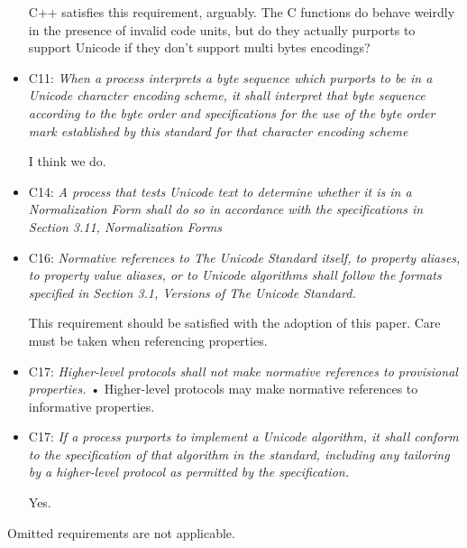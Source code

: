 \documentclass{wg21}
\begin{document}
\begin{itemize}
    C++ satisfies this requirement, arguably. The C functions do behave weirdly in the presence of invalid code units, but do they actually purports to support Unicode if they don't support multi bytes encodings?

    \item C11: \emph{When a process interprets a byte sequence which purports to be in a Unicode character
        encoding scheme, it shall interpret that byte sequence according to the byte order and
        specifications for the use of the byte order mark established by this standard for that
        character encoding scheme}

    I think we do.

    \item C14: \emph{A process that tests Unicode text to determine whether it is in a Normalization Form
        shall do so in accordance with the specifications in Section 3.11, Normalization Forms}


    \item C16: \emph{Normative references to The Unicode Standard itself, to property aliases, to property
        value aliases, or to Unicode algorithms shall follow the formats specified in Section 3.1,
        Versions of The Unicode Standard.}

    This requirement should be satisfied with the adoption of this paper.
    Care must be taken when referencing properties.

    \item C17: \emph{Higher-level protocols shall not make normative references to provisional properties.}
    • Higher-level protocols may make normative references to informative properties.

    \item C17: \emph{If a process purports to implement a Unicode algorithm, it shall conform to the specification of that algorithm in the standard, including any tailoring by a higher-level protocol as permitted by the specification.}

    Yes.
\end{itemize}
Omitted requirements are not applicable.
\end{document}
